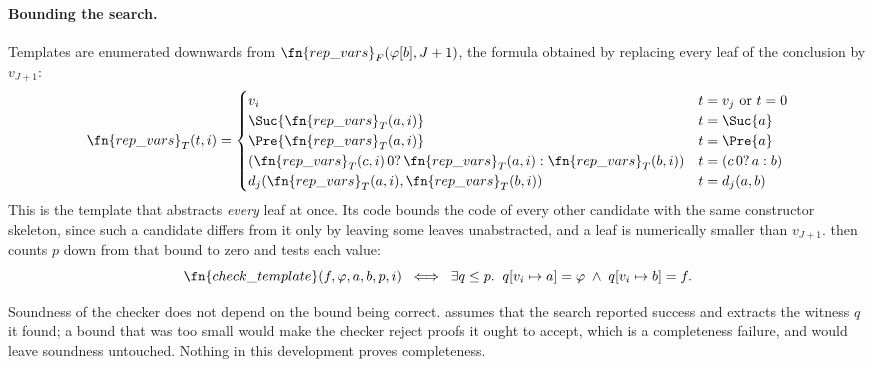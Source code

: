 \paragraph{Bounding the search.}
Templates are enumerated downwards from
$\fn{rep\_vars}_F(\varphi[b], J+1)$, the formula obtained by replacing every
leaf of the conclusion by $v_{J+1}$:
\[
\fn{rep\_vars}_T(t, i) =
\begin{cases}
v_i                                        & t = v_j \text{ or } t = 0\\
\Suc{\fn{rep\_vars}_T(a, i)}               & t = \Suc{a}\\
\Pre{\fn{rep\_vars}_T(a, i)}               & t = \Pre{a}\\
(\fn{rep\_vars}_T(c, i)\,0?\,\fn{rep\_vars}_T(a, i) : \fn{rep\_vars}_T(b, i))
                                           & t = (c\,0?\,a:b)\\
d_j(\fn{rep\_vars}_T(a, i), \fn{rep\_vars}_T(b, i))
                                           & t = d_j(a, b)
\end{cases}
\]
This is the template that abstracts \emph{every} leaf at once.  Its code
bounds the code of every other candidate with the same constructor skeleton,
since such a candidate differs from it only by leaving some leaves
unabstracted, and a leaf is numerically smaller than $v_{J+1}$.
 then counts $p$ down from that bound to zero and tests
each value:
\[
\fn{check\_template}(f, \varphi, a, b, p, i) \;\;\Longleftrightarrow\;\;
\exists q \leq p.\;\; q[v_i \mapsto a] = \varphi \;\wedge\; q[v_i \mapsto b] = f.
\]


\begin{remarkx}
Soundness of the checker does not depend on the bound being correct.
 assumes that the search reported success and
extracts the witness $q$ it found; a bound that was too small would make the
checker reject proofs it ought to accept, which is a completeness failure, and
would leave soundness untouched.  Nothing in this development proves
completeness.
\end{remarkx}

